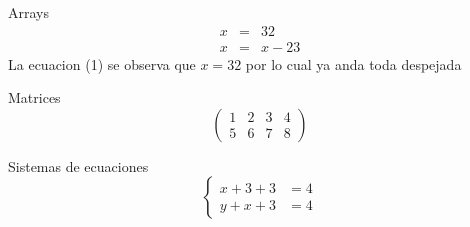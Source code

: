 \documentclass[12pt]{article}
\begin{document}
Arrays
\begin{eqnarray}
x& = &32\\
x& = &x-23
\end{eqnarray}
La ecuacion (1) se observa que $x=32$ por lo cual ya anda toda despejada


Matrices
\[
\left(
\begin{array}{rrr|r}
 	1 & 2 & 3 & 4\\
	5 & 6 & 7 & 8
\end{array}
\right)
\]


Sistemas de ecuaciones
\[
\left\{
\begin{array}{cc}
x+3+3 & = 4\\
y+x+3 & = 4
\end{array}
\right .
\]
\end{document}
